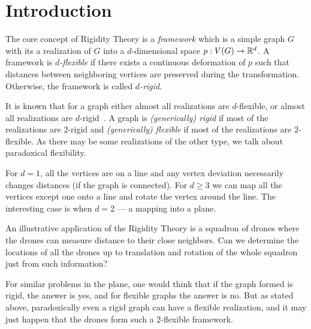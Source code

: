 
\chapter{Introduction}
\setcounter{page}{1}


The core concept of Rigidity Theory is a \emph{framework} which is
a simple graph \(G\) with its a realization of \(G\)
into a \(d\)-dimensional space \(p: V(G) \to \mathbb{R}^d\).
A framework is \emph{\( d \)-flexible} if there exists
a continuous deformation of \( p \) such that
distances between neighboring vertices are preserved during the transformation.
Otherwise, the framework is called \emph{\( d \)-rigid}.

It is known that for a graph either almost all realizations are \( d \)-flexible,
or almost all realizations are \( d \)-rigid~\cite{generically_rigid_graphs}.
A graph is \emph{(generically) rigid} if most of the realizations are \( 2 \)-rigid
and \emph{(generically) flexible} if most of the realizations are \( 2 \)-flexible.
As there may be some realizations of the other type,
we talk about paradoxical flexibility.

For \( d = 1 \), all the vertices are on a line
and any vertex deviation necessarily changes distances (if the graph is connected).
%
For \( d \ge 3 \) we can map all the vertices except one onto a line and
rotate the vertex around the line.
%
The interesting case is when \( d = 2 \) --- a mapping into a plane.

An illustrative application of the Rigidity Theory is a squadron of drones
where the drones can measure distance to their close neighbors.
Can we determine the locations of all the drones
up to translation and rotation of the whole squadron
just from such information?

For similar problems in the plane,
one would think that if the graph formed is rigid, the answer is yes, and
for flexible graphs the answer is no.
But as stated above, paradoxically even a rigid graph can have a flexible realization,
and it may just happen that the drones form such a \( 2 \)-flexible framework.

